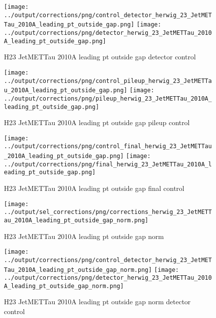 \documentclass[11pt]{book}
\begin{document}
\begin{figure}[ht]
\centering
\texttt{[image: ../output/corrections/png/control\_detector\_herwig\_23\_JetMETTau\_2010A\_leading\_pt\_outside\_gap.png]}
\texttt{[image: ../output/corrections/png/detector\_herwig\_23\_JetMETTau\_2010A\_leading\_pt\_outside\_gap.png]}
\caption{H23 JetMETTau 2010A leading pt outside gap detector control}
\label{fig:H23_JetMETTau_2010A_leading_pt_outside_gap_detector_control}
\end{figure}

\begin{figure}[ht]
\centering
\texttt{[image: ../output/corrections/png/control\_pileup\_herwig\_23\_JetMETTau\_2010A\_leading\_pt\_outside\_gap.png]}
\texttt{[image: ../output/corrections/png/pileup\_herwig\_23\_JetMETTau\_2010A\_leading\_pt\_outside\_gap.png]}
\caption{H23 JetMETTau 2010A leading pt outside gap pileup control}
\label{fig:H23_JetMETTau_2010A_leading_pt_outside_gap_pileup_control}
\end{figure}


\begin{figure}[ht]
\centering
\texttt{[image: ../output/corrections/png/control\_final\_herwig\_23\_JetMETTau\_2010A\_leading\_pt\_outside\_gap.png]}
\texttt{[image: ../output/corrections/png/final\_herwig\_23\_JetMETTau\_2010A\_leading\_pt\_outside\_gap.png]}
\caption{H23 JetMETTau 2010A leading pt outside gap final control}
\label{fig:H23_JetMETTau_2010A_leading_pt_outside_gap_final_control}
\end{figure}



\begin{figure}[ht]
\centering
\texttt{[image: ../output/sel\_corrections/png/corrections\_herwig\_23\_JetMETTau\_2010A\_leading\_pt\_outside\_gap\_norm.png]}
\caption{H23 JetMETTau 2010A leading pt outside gap norm}
\label{fig:H23_JetMETTau_2010A_leading_pt_outside_gap_norm}
\end{figure}

\begin{figure}[ht]
\centering
\texttt{[image: ../output/corrections/png/control\_detector\_herwig\_23\_JetMETTau\_2010A\_leading\_pt\_outside\_gap\_norm.png]}
\texttt{[image: ../output/corrections/png/detector\_herwig\_23\_JetMETTau\_2010A\_leading\_pt\_outside\_gap\_norm.png]}
\caption{H23 JetMETTau 2010A leading pt outside gap norm detector control}
\label{fig:H23_JetMETTau_2010A_leading_pt_outside_gap_norm_detector_control}
\end{figure}
\end{document}
